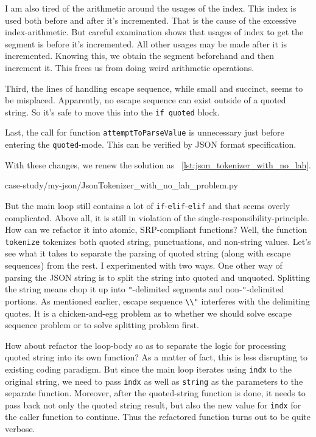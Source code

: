 \documentclass[oneside,11pt]{book}
\theoremstyle{definition}
\theoremstyle{remark}
\newcommand{\code}[1]{\mbox{\lstinline{#1}}}
\begin{document}
I am also tired of the arithmetic around the usages of the index.
This index is used both before and after it's incremented.
That is the cause of the excessive index-arithmetic.
But careful examination shows that usages of index to get the segment is before it's incremented.
All other usages may be made after it is incremented.
Knowing this, we obtain the segment beforehand and then increment it.
This frees us from doing weird arithmetic operations.

Third, the lines of handling escape sequence, while small and succinct, seems to be misplaced.
Apparently, no escape sequence can exist outside of a quoted string.
So it's safe to move this into the \code{if quoted} block.

Last, the call for function \code{attemptToParseValue} is unnecessary just before entering the
\code{quoted}-mode.
This can be verified by JSON format specification.

With these changes, we renew the solution as ~\autoref{lst:json_tokenizer_with_no_lah}.


{case-study/my-json/JsonTokenizer_with_no_lah_problem.py}

But the main loop still contains a lot of \code{if}-\code{elif}-\code{elif} and that seems overly
complicated.
Above all, it is still in violation of the single-responsibility-principle.
How can we refactor it into atomic, SRP-compliant functions?
Well, the function \code{tokenize} tokenizes both quoted string, punctuations,
and non-string values.
Let's see what it takes to separate the parsing of quoted string (along with escape sequences) from
the rest.
I experimented with two ways.
One other way of parsing the JSON string is to split the string into quoted and unquoted.
Splitting the string means chop it up into \code{"}-delimited segments and non-\code{"}-delimited
portions.
As mentioned earlier, escape sequence \code{\\"} interferes with the delimiting quotes.
It is a chicken-and-egg problem as to whether we should solve escape sequence problem or
to solve splitting problem first.

How about refactor the loop-body so as to separate the logic for processing quoted string into
its own function?
As a matter of fact, this is less disrupting to existing coding paradigm.
But since the main loop iterates using \code{indx} to the original string, we need to pass
\code{indx} as well as \code{string} as the parameters to the separate function.
Moreover, after the quoted-string function is done, it needs to pass back not only the quoted
string result, but also the new value for
\code{indx} for the caller function to continue.
Thus the refactored function turns out to be quite verbose.
\end{document}
